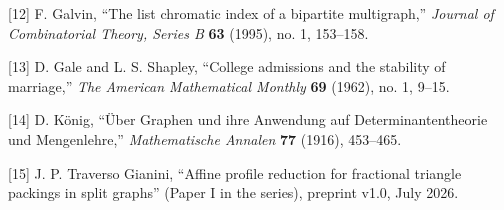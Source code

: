 \documentclass[
  11pt,
]{article}
\begin{document}
{[}12{]} F. Galvin, ``The list chromatic index of a bipartite
multigraph,'' \emph{Journal of Combinatorial Theory, Series B}
\textbf{63} (1995), no. 1, 153--158.

{[}13{]} D. Gale and L. S. Shapley, ``College admissions and the
stability of marriage,'' \emph{The American Mathematical Monthly}
\textbf{69} (1962), no. 1, 9--15.

{[}14{]} D. König, ``Über Graphen und ihre Anwendung auf
Determinantentheorie und Mengenlehre,'' \emph{Mathematische Annalen}
\textbf{77} (1916), 453--465.

{[}15{]} J. P. Traverso Gianini, ``Affine profile reduction for
fractional triangle packings in split graphs'' (Paper I in the series),
preprint v1.0, July 2026.
\end{document}
